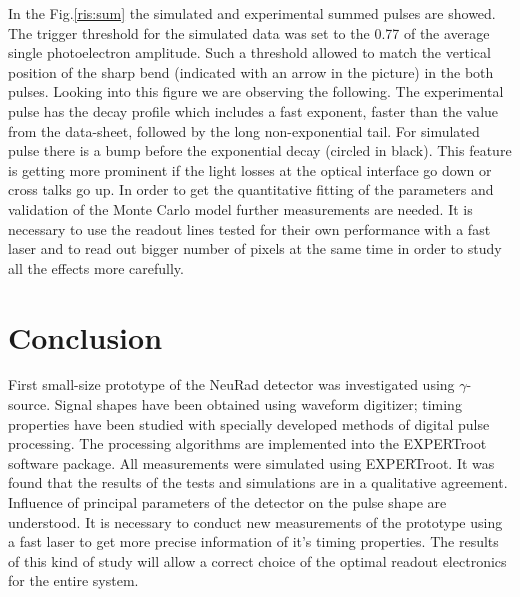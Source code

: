 \documentclass{webofc}
\newcommand{\er}{\textmd{EXPERTroot}}
\begin{document}
In the Fig.\ref{ris:sum} the simulated and experimental summed pulses are showed. The trigger threshold for the simulated data was set to the 0.77 of the average single photoelectron amplitude.
Such a threshold allowed to match the vertical position of the sharp bend (indicated with an arrow in the picture) in the both pulses. Looking into this figure we are observing the following. The experimental pulse has the decay profile which includes a fast exponent, faster than the value from the data-sheet, followed by the long non-exponential tail. For simulated pulse there is a bump before the exponential decay (circled in black). This feature is getting more prominent if the light losses at the optical interface go down or cross talks go up. In order to get the quantitative fitting of the parameters and validation of the Monte Carlo model further measurements are needed. It is necessary to use the readout lines tested for their own performance with a fast laser and to read out bigger number of pixels at the same time in order to study all the effects more carefully.

\section{Conclusion}
		
	First small-size prototype of the NeuRad detector was investigated using
	$\gamma$-source. Signal shapes have been obtained using waveform digitizer; timing properties have been studied with specially developed methods of digital pulse processing. The processing algorithms are implemented into the EXPERTroot software package. All measurements were simulated using \er. It was found that the results of the tests and simulations are in a qualitative agreement. Influence of principal parameters of the detector on the pulse shape are understood. It is necessary to conduct new measurements of the prototype using a fast laser to get more precise information of it's timing properties.
	The results of this kind of study will allow a correct choice of the optimal readout electronics for the entire system.
	
	
	
\end{document}
